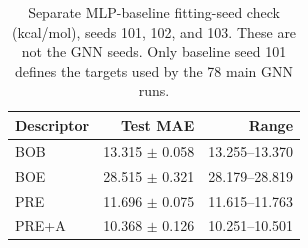 \begin{table}[H]
\centering
\scriptsize
\setlength{\tabcolsep}{4pt}
\renewcommand{\arraystretch}{1.35}
\caption{Separate MLP-baseline fitting-seed check (kcal/mol), seeds 101, 102, and 103. These are not the GNN seeds. Only baseline seed 101 defines the targets used by the 78 main GNN runs.}
\begin{tabular}{lrr}
\toprule
Descriptor & Test MAE & Range \\
\midrule
BOB & 13.315 $\pm$ 0.058 & 13.255--13.370 \\
BOE & 28.515 $\pm$ 0.321 & 28.179--28.819 \\
PRE & 11.696 $\pm$ 0.075 & 11.615--11.763 \\
PRE+A & 10.368 $\pm$ 0.126 & 10.251--10.501 \\
\bottomrule
\end{tabular}
\end{table}
